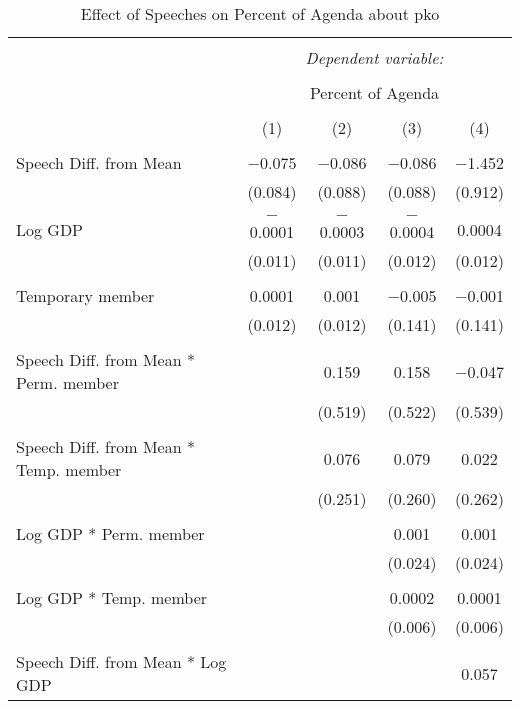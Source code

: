 
\begin{table}[!htbp] \centering 
  \caption{Effect of Speeches on Percent of Agenda about pko} 
  \label{} 
\begin{tabular}{@{\extracolsep{5pt}}lcccc} 
\\[-1.8ex]\hline 
\hline \\[-1.8ex] 
 & \multicolumn{4}{c}{\textit{Dependent variable:}} \\ 
\cline{2-5} 
\\[-1.8ex] & \multicolumn{4}{c}{Percent of Agenda} \\ 
\\[-1.8ex] & (1) & (2) & (3) & (4)\\ 
\hline \\[-1.8ex] 
 Speech Diff. from Mean & $-$0.075 & $-$0.086 & $-$0.086 & $-$1.452 \\ 
  & (0.084) & (0.088) & (0.088) & (0.912) \\ 
  & & & & \\ 
 Log GDP & $-$0.0001 & $-$0.0003 & $-$0.0004 & 0.0004 \\ 
  & (0.011) & (0.011) & (0.012) & (0.012) \\ 
  & & & & \\ 
 Temporary member & 0.0001 & 0.001 & $-$0.005 & $-$0.001 \\ 
  & (0.012) & (0.012) & (0.141) & (0.141) \\ 
  & & & & \\ 
 Speech Diff. from Mean * Perm. member &  & 0.159 & 0.158 & $-$0.047 \\ 
  &  & (0.519) & (0.522) & (0.539) \\ 
  & & & & \\ 
 Speech Diff. from Mean * Temp. member &  & 0.076 & 0.079 & 0.022 \\ 
  &  & (0.251) & (0.260) & (0.262) \\ 
  & & & & \\ 
 Log GDP * Perm. member &  &  & 0.001 & 0.001 \\ 
  &  &  & (0.024) & (0.024) \\ 
  & & & & \\ 
 Log GDP * Temp. member &  &  & 0.0002 & 0.0001 \\ 
  &  &  & (0.006) & (0.006) \\ 
  & & & & \\ 
 Speech Diff. from Mean * Log GDP &  &  &  & 0.057 \\ 

\end{tabular}
\end{table}
